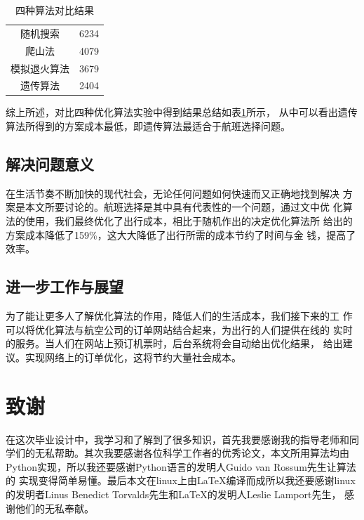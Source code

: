 \documentclass[fontset=fandol,a4paper,zihao=5]{ctexart}
\begin{document}
			
			\begin{table}[!htbp]
				\centering
				\caption{四种算法对比结果}
				\label{tab:cmp}
				\begin{tabular}{cc}
					\toprule[1pt]
					\makebox[0.3\textwidth]{算法} & \makebox[0.3\textwidth]{方案成本} \\
					\midrule
					随机搜索 		& 6234 \\
					爬山法			 &  4079 \\
					模拟退火算法	   & 3679 \\
					遗传算法		&  2404 \\
					\bottomrule[1pt]
				\end{tabular} 
			\end{table}
		
			综上所述，对比四种优化算法实验中得到结果总结如表\ref{tab:cmp}所示，
            从中可以看出遗传算法所得到的方案成本最低，即遗传算法最适合于航班选择问题。
		\subsection{解决问题意义}
			在生活节奏不断加快的现代社会，无论任何问题如何快速而又正确地找到解决
            方案是本文所要讨论的。航班选择是其中具有代表性的一个问题，通过文中优
            化算法的使用，我们最终优化了出行成本，相比于随机作出的决定优化算法所
            给出的方案成本降低了159\%，这大大降低了出行所需的成本节约了时间与金
            钱，提高了效率。
		\subsection{进一步工作与展望}
			为了能让更多人了解优化算法的作用，降低人们的生活成本，我们接下来的工
            作可以将优化算法与航空公司的订单网站结合起来，为出行的人们提供在线的
            实时的服务。当人们在网站上预订机票时，后台系统将会自动给出优化结果，
            给出建议。实现网络上的订单优化，这将节约大量社会成本。
	\newpage

		
	
	\newpage
	\section{致谢}
		在这次毕业设计中，我学习和了解到了很多知识，首先我要感谢我的指导老师和同
        学们的无私帮助。其次我要感谢各位科学工作者的优秀论文，本文所用算法均由
        Python实现，所以我还要感谢Python语言的发明人Guido van Rossum先生让算法的
        实现变得简单易懂。最后本文在linux上由\LaTeX 编译而成所以我还要感谢linux
        的发明者Linus Benedict Torvalds先生和\LaTeX 的发明人Leslie Lamport先生，
        感谢他们的无私奉献。
\end{document}
